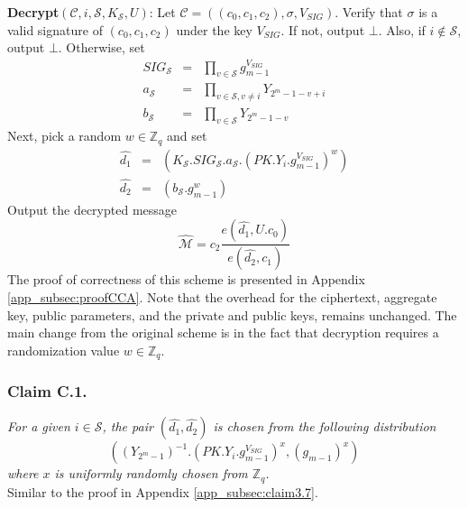 \noindent \textbf{Decrypt}$(\mathcal{C},i,\mathcal{S},K_{\mathcal{S}},U)$: Let $\mathcal{C}=((c_0,c_1,c_2),\sigma,V_{SIG})$. Verify that $\sigma$ is a valid signature of $(c_0,c_1,c_2)$ under the key $V_{SIG}$. If not, output $\bot$. Also, if $i\notin\mathcal{S}$, output $\bot$. Otherwise, set 
\begin{eqnarray}
  SIG_{\mathcal{S}} &=& \prod_{v\in\mathcal{S}}g^{V_{SIG}}_{m-1}\nonumber\\
  a_{\mathcal{S}} &=& \prod_{v\in\mathcal{S},v\neq i}Y_{2^m-1-v+i}\nonumber\\
  b_{\mathcal{S}} &=& \prod_{v\in\mathcal{S}}Y_{2^m-1-v}\nonumber  
\end{eqnarray}
\noindent Next, pick a random $w\in \mathbb{Z}_q$ and set
 \begin{eqnarray}
  \hat{d_1} &=& (K_{\mathcal{S}}.SIG_{\mathcal{S}}.a_{\mathcal{S}}.(PK.Y_i.g^{V_{SIG}}_{m-1})^w)\nonumber\\
  \hat{d_2} &=& (b_{\mathcal{S}}.g^w_{m-1}) \nonumber
 \end{eqnarray}
 \noindent Output the decrypted message 
 \begin{equation}
  \hat{\mathcal{M}} = c_2\frac{{e}(\hat{d_1},U.c_0)}{{e}(\hat{d_2},c_1)}\nonumber
 \end{equation}
\noindent The proof of correctness of this scheme is presented in Appendix \ref{app_subsec:proofCCA}. Note that the overhead for the ciphertext, aggregate key, public parameters, and the private and public keys, remains unchanged. The main change from the original scheme is in the fact that decryption requires a randomization value $w\in\mathbb{Z}_q$.

\subsubsection{Claim C.1.} \textit{For a given $i\in\mathcal{S}$, the pair $(\hat{d_1},\hat{d_2})$ is chosen from the following distribution 
\begin{equation}
\left(\left({Y_{2^m-1}}\right)^{-1}.\left(PK.Y_i.g^{V_{SIG}}_{m-1}\right)^x,\left(g_{m-1}\right)^x\right)\nonumber
\end{equation}
\noindent where $x$ is uniformly randomly chosen from $\mathbb{Z}_q$.}\\
 Similar to the proof in Appendix \ref{app_subsec:claim3.7}.\\

